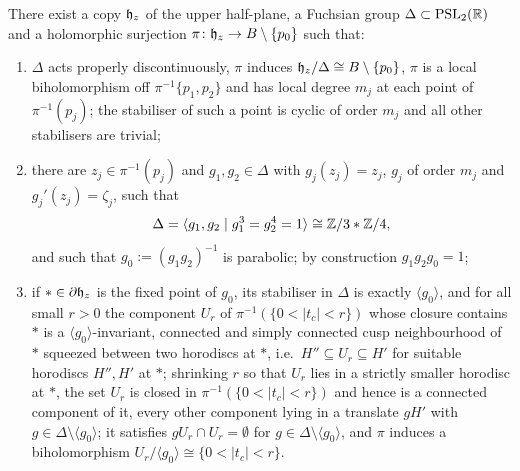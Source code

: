\begin{proposition}\label{prop:uniformisation}
There exist a copy $\mathfrak{h}_z$ of the upper half-plane, a Fuchsian group $\Delta \subset \mathrm{PSL}_2(\mathbb{R})$ and a holomorphic surjection $\pi \colon \mathfrak{h}_z \to B \setminus \{p_0\}$ such that:
\begin{enumerate}[label=(\roman*)]
\item $\Delta$ acts properly discontinuously, $\pi$ induces $\mathfrak{h}_z/\Delta \cong B\setminus\{p_0\}$, $\pi$ is a local biholomorphism off $\pi^{-1}\{p_1,p_2\}$ and has local degree $m_j$ at each point of $\pi^{-1}(p_j)$; the stabiliser of such a point is cyclic of order $m_j$ and all other stabilisers are trivial;
\item there are $z_j \in \pi^{-1}(p_j)$ and $g_1,g_2 \in \Delta$ with $g_j(z_j) = z_j$, $g_j$ of order $m_j$ and $g_j'(z_j) = \zeta_j$, such that
\[
\Delta = \langle g_1,g_2 \mid g_1^3 = g_2^4 = 1\rangle \cong \mathbb{Z}/3 * \mathbb{Z}/4,
\]
and such that $g_0 := (g_1g_2)^{-1}$ is parabolic; by construction $g_1g_2g_0 = 1$;
\item if $* \in \partial\mathfrak{h}_z$ is the fixed point of $g_0$, its stabiliser in $\Delta$ is exactly $\langle g_0\rangle$, and for all small $r>0$ the component $U_r$ of $\pi^{-1}(\{0<|t_c|<r\})$ whose closure contains $*$ is a $\langle g_0\rangle$-invariant, connected and simply connected cusp neighbourhood of $*$ squeezed between two horodiscs at $*$, i.e.\ $H'' \subseteq U_r \subseteq H'$ for suitable horodiscs $H'', H'$ at $*$; shrinking $r$ so that $U_r$ lies in a strictly smaller horodisc at $*$, the set $U_r$ is closed in $\pi^{-1}(\{0<|t_c|<r\})$ and hence is a connected component of it, every other component lying in a translate $gH'$ with $g \in \Delta \setminus \langle g_0\rangle$; it satisfies $gU_r \cap U_r = \emptyset$ for $g \in \Delta \setminus \langle g_0\rangle$, and $\pi$ induces a biholomorphism $U_r/\langle g_0\rangle \cong \{0<|t_c|<r\}$.
\end{enumerate}
\end{proposition}

